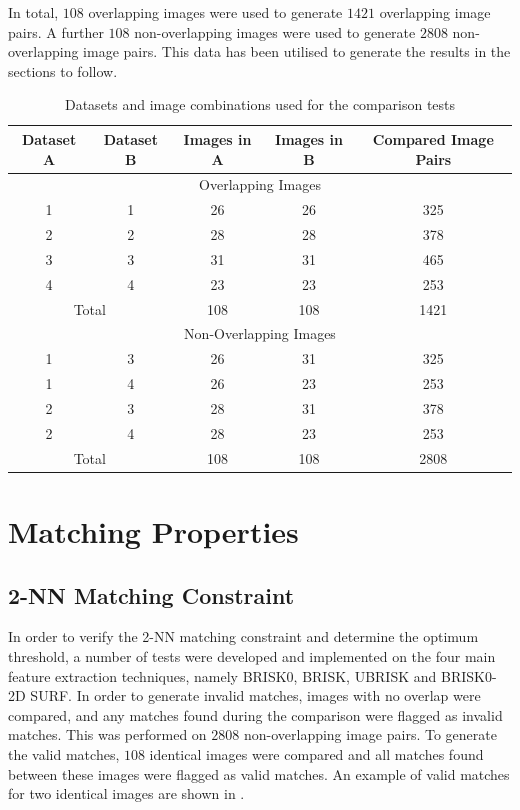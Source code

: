 \documentclass{report}
\begin{document}
In total, $108$ overlapping images were used to generate $1421$ overlapping image pairs. A further $108$ non-overlapping images were used to generate $2808$ non-overlapping image pairs. This data has been utilised to generate the results in the sections to follow. \\ 

\begin{table}
\caption{Datasets and image combinations used for the comparison tests}
\begin{tabular}{|c|c|c|c|c|}
\hline 
Dataset A & Dataset B & Images in A & Images in B & Compared Image Pairs\tabularnewline
\hline 
\hline 
\multicolumn{5}{|c}{Overlapping Images}\tabularnewline
\hline 
1 & 1 & 26 & 26 & 325\tabularnewline
\hline 
2 & 2 & 28 & 28 & 378\tabularnewline
\hline 
3 & 3 & 31 & 31 & 465\tabularnewline
\hline 
4 & 4 & 23 & 23 & 253\tabularnewline
\hline 
\multicolumn{2}{|c|}{Total} & 108 & 108 & 1421\tabularnewline
\hline 
\multicolumn{5}{|c}{Non-Overlapping Images}\tabularnewline
\hline 
1 & 3 & 26 & 31 & 325\tabularnewline
\hline 
1 & 4 & 26 & 23 & 253\tabularnewline
\hline 
2 & 3 & 28 & 31 & 378\tabularnewline
\hline 
2 & 4 & 28 & 23 & 253\tabularnewline
\hline 
\multicolumn{2}{|c|}{Total} & 108 & 108 & 2808\tabularnewline
\hline 
\end{tabular}
\label{table:overlap}
\end{table}



\section{Matching Properties}
\label{sec:matchingProperties}

\subsection{2-NN Matching Constraint}
\label{sec:knnMatchingConstraint}
In order to verify the 2-NN matching constraint and determine the optimum threshold, a number of tests were developed and implemented on the four main feature extraction techniques, namely BRISK0, BRISK, UBRISK and BRISK0-2D SURF. In order to generate invalid matches, images with no overlap were compared, and any matches found during the comparison were flagged as invalid matches. This was performed on $2808$ non-overlapping image pairs. To generate the valid matches, $108$ identical images were compared and all matches found between these images were flagged as valid matches. An example of valid matches for two identical images are shown in .\\
\end{document}
